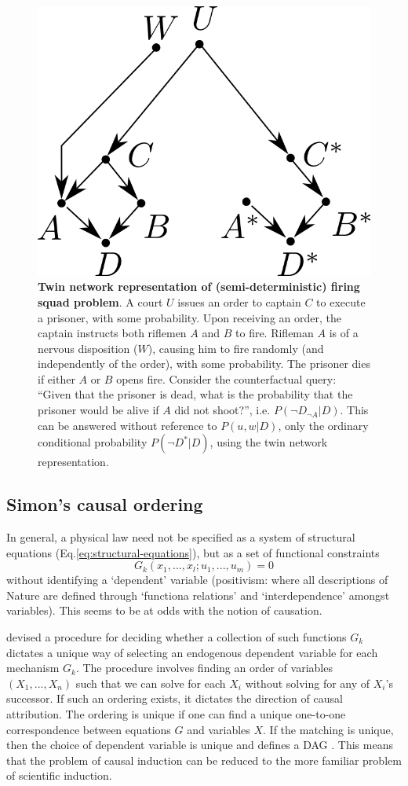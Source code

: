 \documentclass[11pt]{article}
\numberwithin{equation}{section}
\begin{document}
\begin{figure}
\begin{center}
\includegraphics[width=0.4\columnwidth]{figures/twin-network.png}  
\end{center}
\caption{\textbf{Twin network representation of (semi-deterministic) firing squad problem}. A court $U$ issues an order to captain $C$ to execute a prisoner, with some probability. Upon receiving an order, the captain instructs both riflemen $A$ and $B$ to fire. Rifleman $A$ is of a nervous disposition ($W$), causing him to fire randomly (and independently of the order), with some probability. The prisoner dies if either $A$ or $B$ opens fire. Consider the counterfactual query: ``Given that the prisoner is dead, what is the probability that the prisoner would be alive if $A$ did not shoot?'', i.e. $P(\neg D_{\neg A}| D)$. This can be answered without reference to $P(u,w|D)$, only the ordinary conditional probability $P(\neg D^*|D)$, using the twin network representation. }
\label{Fig:twin-network}
\end{figure}

\subsection{Simon's causal ordering}

In general, a physical law need not be specified as a system of structural equations (Eq.\ref{eq:structural-equations}), but as a set of functional constraints
\begin{equation}
G_k(x_1,...,x_l; u_1,...,u_m) = 0
\end{equation}
without identifying a `dependent' variable (positivism: where all descriptions of Nature are defined through `functiona relations' and `interdependence' amongst variables). This seems to be at odds with the notion of causation.

\cite{Simon77} devised a procedure for deciding whether a collection of such functions $G_k$ dictates a unique way of selecting an endogenous dependent variable for each mechanism $G_k$. The procedure involves finding an order of variables $(X_1,...,X_n)$ such that we can solve for each $X_i$ without solving for any of $X_i$'s successor. If such an ordering exists, it dictates the direction of causal attribution. The ordering is unique if one can find a unique one-to-one correspondence between equations $G$ and variables $X$. If the matching is unique, then the choice of dependent variable is unique and defines a DAG \citep{Nayak94}. This means that the problem of causal induction can be reduced to the more familiar problem of scientific induction.
\end{document}
